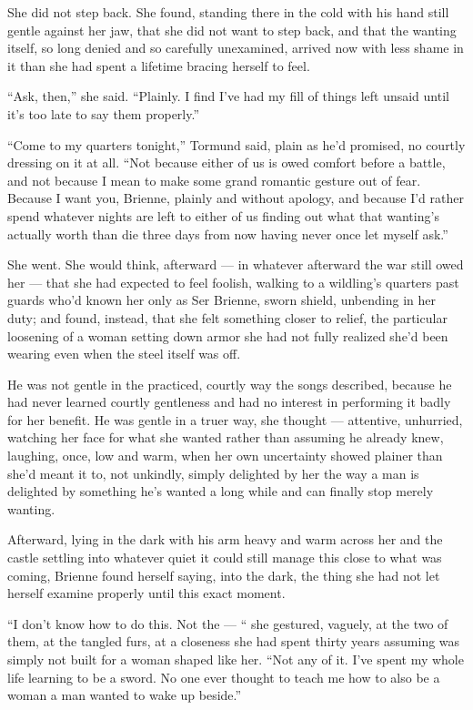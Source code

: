 She did not step back. She found, standing there in the cold with his hand still gentle against her jaw, that she did not want to step back, and that the wanting itself, so long denied and so carefully unexamined, arrived now with less shame in it than she had spent a lifetime bracing herself to feel.

“Ask, then,” she said. “Plainly. I find I’ve had my fill of things left unsaid until it’s too late to say them properly.”

“Come to my quarters tonight,” Tormund said, plain as he’d promised, no courtly dressing on it at all. “Not because either of us is owed comfort before a battle, and not because I mean to make some grand romantic gesture out of fear. Because I want you, Brienne, plainly and without apology, and because I’d rather spend whatever nights are left to either of us finding out what that wanting’s actually worth than die three days from now having never once let myself ask.”

\sceneBreak

She went. She would think, afterward — in whatever afterward the war still owed her — that she had expected to feel foolish, walking to a wildling’s quarters past guards who’d known her only as Ser Brienne, sworn shield, unbending in her duty; and found, instead, that she felt something closer to relief, the particular loosening of a woman setting down armor she had not fully realized she’d been wearing even when the steel itself was off.

He was not gentle in the practiced, courtly way the songs described, because he had never learned courtly gentleness and had no interest in performing it badly for her benefit. He was gentle in a truer way, she thought — attentive, unhurried, watching her face for what she wanted rather than assuming he already knew, laughing, once, low and warm, when her own uncertainty showed plainer than she’d meant it to, not unkindly, simply delighted by her the way a man is delighted by something he’s wanted a long while and can finally stop merely wanting.

Afterward, lying in the dark with his arm heavy and warm across her and the castle settling into whatever quiet it could still manage this close to what was coming, Brienne found herself saying, into the dark, the thing she had not let herself examine properly until this exact moment.

“I don’t know how to do this. Not the — “ she gestured, vaguely, at the two of them, at the tangled furs, at a closeness she had spent thirty years assuming was simply not built for a woman shaped like her. “Not any of it. I’ve spent my whole life learning to be a sword. No one ever thought to teach me how to also be a woman a man wanted to wake up beside.”

